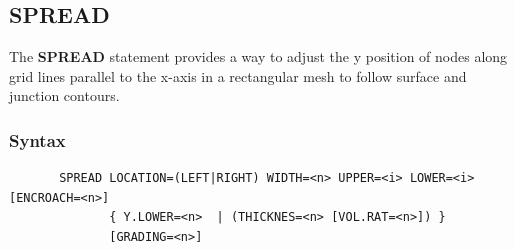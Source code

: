 \documentclass[11pt,pdftex]{article}
\begin{document}
\newpage
\subsection{SPREAD}
The \textbf{SPREAD} statement provides a way to adjust the y
position of nodes along grid lines parallel to the x-axis in a
rectangular mesh to follow surface and junction contours.

\subsubsection*{Syntax}
\begin{verbatim}
       SPREAD LOCATION=(LEFT|RIGHT) WIDTH=<n> UPPER=<i> LOWER=<i> [ENCROACH=<n>]
              { Y.LOWER=<n>  | (THICKNES=<n> [VOL.RAT=<n>]) }
              [GRADING=<n>]
\end{verbatim}
\end{document}

